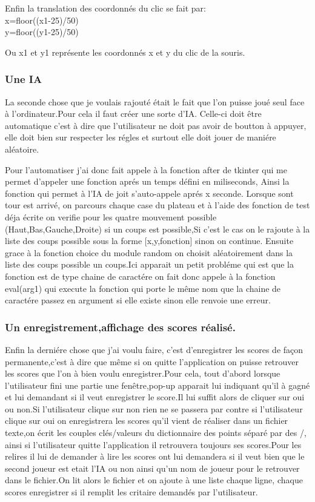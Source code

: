 \documentclass{article}
\begin{document}
Enfin la translation des coordonnés du clic se fait par:
\vspace{0.25cm}
\\ 
x=floor((x1-25)/50)\\ 
y=floor((y1-25)/50)
\vspace{0.25cm}

Ou x1 et y1 représente les coordonnés x et y du clic de la souris.

\subsubsection{Une IA}
La seconde chose que je voulais rajouté était le fait que l'on puisse joué seul face à l'ordinateur.Pour cela il faut créer une sorte d'IA. Celle-ci doit être automatique c'est à dire que l'utilisateur ne doit pas avoir de boutton à appuyer, elle doit bien sur respecter les régles et surtout elle doit jouer de maniére aléatoire.

Pour l'automatiser j'ai donc fait appele à la fonction after de tkinter qui me permet d'appeler une fonction aprés un temps défini en miliseconds, Ainsi la fonction qui permet à l'IA de joit s'auto-appele aprés x seconde. Lorsque sont tour est arrivé, on parcours chaque case du plateau et à l'aide des fonction de test déja écrite on verifie pour les quatre mouvement possible (Haut,Bas,Gauche,Droite) si un coups est possible,Si c'est le cas on le rajoute à la liste des coups possible sous la forme [x,y,fonction] sinon on continue. Ensuite grace à la fonction choice du module random on choisit aléatoirement dans la liste des coups possible un coups.Ici apparait un petit probléme qui est que la fonction est de type chaine de caractére on fait donc appele à la fonction eval(arg1) qui execute la fonction qui porte le même nom que la chaine de caractére passez en argument si elle existe sinon elle renvoie une erreur.

\subsubsection{Un enregistrement,affichage des scores réalisé.}
Enfin la derniére chose que j'ai voulu faire, c'est d'enregistrer les scores de façon permanente,c'est à dire que même si on quitte l'application on puisse retrouver les scores que l'on à bien voulu enregistrer.Pour cela, tout d'abord lorsque l'utilisateur fini une partie une fenêtre,pop-up apparait lui indiquant qu'il à gagné et lui demandant si il veut enregistrer le score.Il lui suffit alors de cliquer sur oui ou non.Si l'utilisateur clique sur non rien ne se passera par contre
si l'utilisateur clique sur oui on enregistrera les scores qu'il vient de réaliser dans un fichier texte,on écrit les couples clés/valeurs du dictionnaire des points séparé par des /, ainsi si l'utilisateur quitte l'application il retrouvera toujours ses scores.Pour les relires il lui de demander à lire les scores ont lui demandera si il veut bien que le second joueur est etait l'IA ou non ainsi qu'un nom de joueur pour le retrouver dans le fichier.On lit alors le fichier et on ajoute à une liste chaque ligne, chaque scores enregistrer si il remplit les critaire demandés par l'utilisateur.
\end{document}
